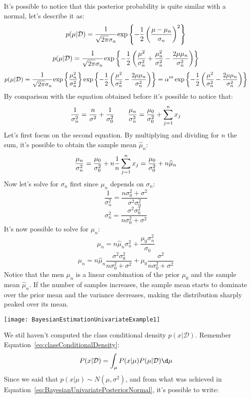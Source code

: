 It's possible to notice that this posterior probability is quite similar with a normal, let's describe it as:
\begin{equation}
	p(\mu\vert \mathcal{D})=\cfrac{1}{\sqrt{2\pi}\sigma_n}\exp{-\frac{1}{2}\left(\frac{\mu-\mu_n}{\sigma_n}\right)^2}
	\label{eq:BayesianUnivariatePosteriorNormal}
\end{equation}
\[
	p(\mu\vert\mathcal{D})=\cfrac{1}{\sqrt{2\pi}\sigma_n}\exp{-\frac{1}{2}\left(\frac{\mu^2}{\sigma_n^2}+\frac{\mu_n^2}{\sigma_n^2}-\frac{2\mu\mu_n}{\sigma_n^2}\right)}
\]
\[
	p(\mu\vert\mathcal{D})=\cfrac{1}{\sqrt{2\pi}\sigma_n}\exp{\frac{\mu_n^2}{\sigma_n^2}}\exp{-\frac{1}{2}\left(\frac{\mu^2}{\sigma_n^2}-\frac{2\mu\mu_n}{\sigma_n^2}\right)}=\alpha'''\exp{-\frac{1}{2}\left(\frac{\mu^2}{\sigma_n^2}-\frac{2\mu\mu_n}{\sigma_n^2}\right)}
\]
By comparison with the equation obtained before it's possible to notice that:
\[
	\frac{1}{\sigma_n^2}=\frac{n}{\sigma^2}+\frac{1}{\sigma^2_0}\qquad \frac{\mu_n}{\sigma_n^2}=\frac{\mu_0}{\sigma_0^2}+\displaystyle\sum_{j=1}^nx_j
\]
Let's first focus on the second equation. By multiplying and dividing for $n$ the sum, it's possible to obtain the sample mean $\widehat{\mu}_n$:
\[
	\frac{\mu_n}{\sigma_n^2}=\frac{\mu_0}{\sigma_0^2}+n\frac{1}{n}\displaystyle\sum_{j=1}^nx_j=\frac{\mu_0}{\sigma_0^2}+n\widehat{\mu}_n
\]
Now let's solve for $\sigma_n$ first since $\mu_n$ depends on $\sigma_n$:
\[
	\frac{1}{\sigma^2_n}=\frac{n\sigma^2_0+\sigma^2}{\sigma^2\sigma_0^2}
\]
\[
	\sigma^2_n=\frac{\sigma^2\sigma_0^2}{n\sigma^2_0+\sigma^2}
\]
It's now possible to solve for $\mu_n$:
\[
	\mu_n=n\widehat{\mu}_n\sigma^2_n+\frac{\mu_0\sigma_n^2}{\sigma_0}
\]
\[
	\mu_n=n\widehat{\mu}_n\frac{\sigma^2\sigma_0^2}{n\sigma^2_0+\sigma^2}+\mu_0\frac{\sigma^2}{n\sigma^2_0+\sigma^2}
\]
Notice that the men $\mu_n$ is a linear combination of the prior $\mu_0$ and the sample mean $\widehat{\mu}_n$. If the number of samples increases, the sample mean starts to dominate over the prior mean and the variance decreases, making the distribution sharply peaked over its mean.
\begin{center}
	\texttt{[image: BayesianEstimationUnivariateExample1]}
\end{center}
We stil haven't computed the class conditional density $p(x\vert\mathcal{D})$. Remember Equation~\ref{eq:classConditionalDensity}:
\[
	P(x\vert \mathcal{D})=\int_\mu P(x\vert \mu)P(\mu\vert \mathcal{D})\d\mu
\]
Since we said that $p(x\vert\mu)\sim N(\mu, \sigma^2)$, and from what was achieved in Equation~\ref{eq:BayesianUnivariatePosteriorNormal}, it's possible to write:
